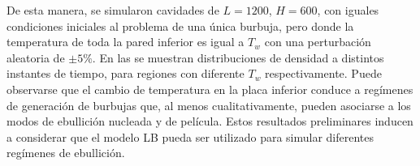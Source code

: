 De esta manera, se simularon cavidades de $L=1200$, $H=600$, con iguales condiciones iniciales al problema de una \'unica burbuja, pero donde la temperatura de toda la pared inferior es igual a $T_w$ con una perturbaci\'on aleatoria de $\pm5\%$. En las  se muestran distribuciones de densidad a distintos instantes de tiempo, para regiones con diferente $T_w$ respectivamente. Puede observarse que el cambio de temperatura en la placa inferior conduce a reg\'imenes de generaci\'on de burbujas que, al menos cualitativamente, pueden asociarse a los modos de ebullici\'on nucleada y de pel\'icula. Estos resultados preliminares inducen a considerar que el modelo LB pueda ser utilizado para simular diferentes reg\'imenes de ebullici\'on. 



